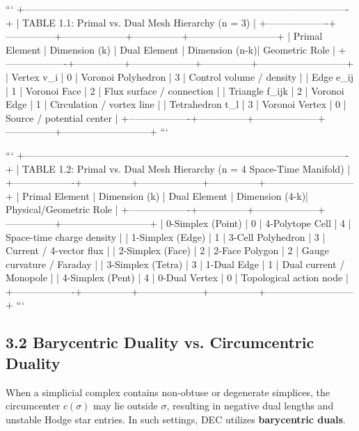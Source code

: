 \documentclass[11pt,twoside,openright]{amsbook}
\begin{document}
```
+----------------------------------------------------------------------------------------------------+
| TABLE 1.1: Primal vs. Dual Mesh Hierarchy (n = 3)                                                 |
+-------------------+---------------+--------------------+---------------+---------------------------+
| Primal Element    | Dimension (k) | Dual Element       | Dimension (n-k)| Geometric Role           |
+-------------------+---------------+--------------------+---------------+---------------------------+
| Vertex v_i        | 0             | Voronoi Polyhedron | 3             | Control volume / density  |
| Edge e_{ij}       | 1             | Voronoi Face       | 2             | Flux surface / connection |
| Triangle f_{ijk}  | 2             | Voronoi Edge       | 1             | Circulation / vortex line |
| Tetrahedron t_l   | 3             | Voronoi Vertex     | 0             | Source / potential center |
+-------------------+---------------+--------------------+---------------+---------------------------+
```

```
+----------------------------------------------------------------------------------------------------+
| TABLE 1.2: Primal vs. Dual Mesh Hierarchy (n = 4 Space-Time Manifold)                             |
+-------------------+---------------+--------------------+---------------+---------------------------+
| Primal Element    | Dimension (k) | Dual Element       | Dimension (4-k)| Physical/Geometric Role   |
+-------------------+---------------+--------------------+---------------+---------------------------+
| 0-Simplex (Point) | 0             | 4-Polytope Cell    | 4             | Space-time charge density |
| 1-Simplex (Edge)  | 1             | 3-Cell Polyhedron  | 3             | Current / 4-vector flux   |
| 2-Simplex (Face)  | 2             | 2-Face Polygon     | 2             | Gauge curvature / Faraday |
| 3-Simplex (Tetra) | 3             | 1-Dual Edge        | 1             | Dual current / Monopole   |
| 4-Simplex (Pent)  | 4             | 0-Dual Vertex      | 0             | Topological action node   |
+-------------------+---------------+--------------------+---------------+---------------------------+
```

\subsection{3.2 Barycentric Duality vs. Circumcentric Duality}

When a simplicial complex contains non-obtuse or degenerate simplices, the circumcenter $c(\sigma)$ may lie outside $\sigma$, resulting in negative dual lengths and unstable Hodge star entries. In such settings, DEC utilizes \textbf{barycentric duals}.
\end{document}
